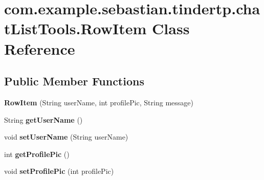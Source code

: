 \hypertarget{classcom_1_1example_1_1sebastian_1_1tindertp_1_1chatListTools_1_1RowItem}{}\section{com.\+example.\+sebastian.\+tindertp.\+chat\+List\+Tools.\+Row\+Item Class Reference}
\label{classcom_1_1example_1_1sebastian_1_1tindertp_1_1chatListTools_1_1RowItem}
\subsection*{Public Member Functions}
\begin{DoxyCompactItemize}
\item 
{\bfseries Row\+Item} (String user\+Name, int profile\+Pic, String message)\hypertarget{classcom_1_1example_1_1sebastian_1_1tindertp_1_1chatListTools_1_1RowItem_a7210c6e752d48ef1e96fcef7f245d9d9}{}\label{classcom_1_1example_1_1sebastian_1_1tindertp_1_1chatListTools_1_1RowItem_a7210c6e752d48ef1e96fcef7f245d9d9}

\item 
String {\bfseries get\+User\+Name} ()\hypertarget{classcom_1_1example_1_1sebastian_1_1tindertp_1_1chatListTools_1_1RowItem_a55b4c7a8bf2484b8c9bc538af08f7efd}{}\label{classcom_1_1example_1_1sebastian_1_1tindertp_1_1chatListTools_1_1RowItem_a55b4c7a8bf2484b8c9bc538af08f7efd}

\item 
void {\bfseries set\+User\+Name} (String user\+Name)\hypertarget{classcom_1_1example_1_1sebastian_1_1tindertp_1_1chatListTools_1_1RowItem_ad6f7e83a98b2abbbe8144162e2faabce}{}\label{classcom_1_1example_1_1sebastian_1_1tindertp_1_1chatListTools_1_1RowItem_ad6f7e83a98b2abbbe8144162e2faabce}

\item 
int {\bfseries get\+Profile\+Pic} ()\hypertarget{classcom_1_1example_1_1sebastian_1_1tindertp_1_1chatListTools_1_1RowItem_abec4daf1471796e89c52f8a1dd3647c5}{}\label{classcom_1_1example_1_1sebastian_1_1tindertp_1_1chatListTools_1_1RowItem_abec4daf1471796e89c52f8a1dd3647c5}

\item 
void {\bfseries set\+Profile\+Pic} (int profile\+Pic)\hypertarget{classcom_1_1example_1_1sebastian_1_1tindertp_1_1chatListTools_1_1RowItem_ac37f6858033593cbcd3fca1558dbbde2}{}\label{classcom_1_1example_1_1sebastian_1_1tindertp_1_1chatListTools_1_1RowItem_ac37f6858033593cbcd3fca1558dbbde2}


\end{DoxyCompactItemize}
